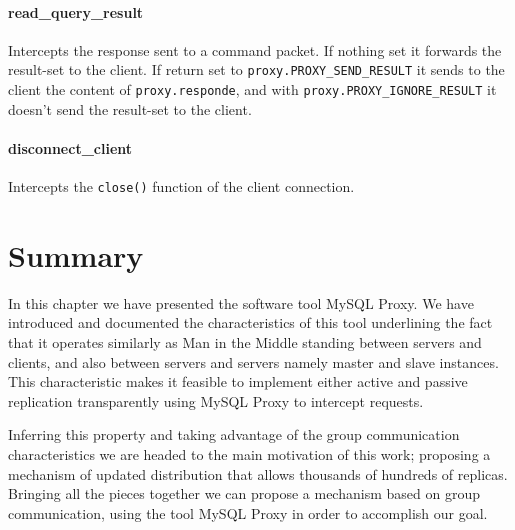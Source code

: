 \paragraph{read\_query\_result\\}
Intercepts the response sent to a command packet. If nothing set it forwards the result-set to the client. If return set to \texttt{proxy.PROXY\_SEND\_RESULT} it sends to the client the content of \texttt{proxy.responde}, and with \texttt{proxy.PROXY\_IGNORE\_RESULT} it doesn't send the result-set to the client.

\paragraph{disconnect\_client\\}
Intercepts the \texttt{close()} function of the client connection.


\section{Summary}



In this chapter we have presented the software tool MySQL Proxy. We have introduced and documented the characteristics of this tool underlining the fact that it operates similarly as Man in the Middle standing between servers and clients, and also between servers and servers namely master and slave instances. This characteristic makes it feasible to implement either active and passive replication transparently using MySQL Proxy to intercept requests.

Inferring this property and taking advantage of the group communication characteristics we are headed to the main motivation of this work; proposing a mechanism of updated distribution that allows thousands of hundreds of replicas. Bringing all the pieces together we can propose a mechanism based on group communication, using the tool MySQL Proxy in order to accomplish our goal.




